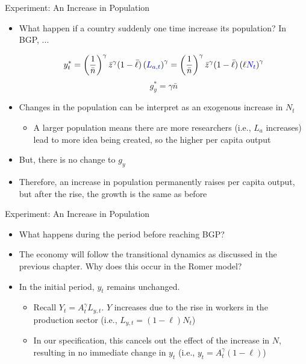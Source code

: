 \documentclass[aspectratio=1610]{beamer}
\begin{document}
\begin{frame}[wide]{Experiment: An Increase in Population}
	\begin{itemize}
		\item What happen if a country suddenly one time increase its population? In BGP, ...
		
	\[y_t^* = \left(\frac{1}{\bar{n}}\right)^\gamma \bar{z}^\gamma  (1-\bar{\ell}) \left( \textcolor{blue}{L_{a,t}}\right)^\gamma = \left(\frac{1}{\bar{n}}\right)^\gamma \bar{z}^\gamma  (1-\bar{\ell}) \left( \ell \textcolor{blue}{N_t} \right)^\gamma \]
	\[	g_y^* = \gamma \bar{n} \]
	
		\item Changes in the population can be interpret as an exogenous increase in $N_t$ 
		\begin{itemize}
			\item A larger population means there are more researchers (i.e., $L_a$ increases) lead to more idea being created, so the higher per capita output
		\end{itemize}
		\item But, there is no change to $g_y$
		\item Therefore, an increase in population permanently raises per capita output, but after the rise, the growth is the same as before
	\end{itemize}
\end{frame}

\begin{frame}[wide]{Experiment: An Increase in Population}
	\begin{itemize}
		\item What happens during the period before reaching BGP?
		\vspace{1mm}
		\item The economy will follow the transitional dynamics as discussed in the previous chapter. Why does this occur in the Romer model?
		\vspace{1mm}
		\item In the initial period, $y_t$ remains unchanged.
		\begin{itemize}
			\item Recall $Y_t = A_t^\gamma L_{y,t}$. $Y$ increases due to the rise in workers in the production sector (i.e., $L_{y,t} = (1-\ell)N_t$)
			\item In our specification, this cancels out the effect of the increase in $N$, resulting in no immediate change in $y_t$ (i.e., $y_t = A_t^\gamma (1-\ell)$)
		\end{itemize}
	\end{itemize}
\end{frame}
\end{document}
